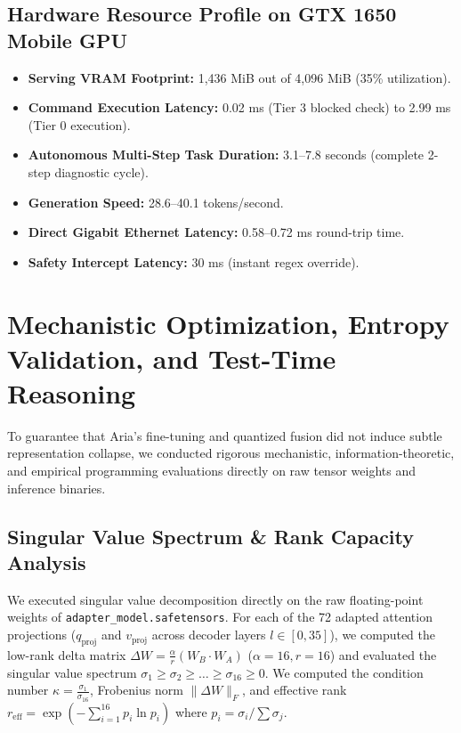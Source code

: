 \documentclass[10pt,a4paper]{article}
\begin{document}
\subsection{Hardware Resource Profile on GTX 1650 Mobile GPU}
\begin{itemize}
    \item \textbf{Serving VRAM Footprint:} 1,436 MiB out of 4,096 MiB (35\% utilization).
    \item \textbf{Command Execution Latency:} 0.02 ms (Tier 3 blocked check) to 2.99 ms (Tier 0 execution).
    \item \textbf{Autonomous Multi-Step Task Duration:} 3.1--7.8 seconds (complete 2-step diagnostic cycle).
    \item \textbf{Generation Speed:} 28.6--40.1 tokens/second.
    \item \textbf{Direct Gigabit Ethernet Latency:} 0.58--0.72 ms round-trip time.
    \item \textbf{Safety Intercept Latency:} 30 ms (instant regex override).
\end{itemize}

\section{Mechanistic Optimization, Entropy Validation, and Test-Time Reasoning}

To guarantee that Aria's fine-tuning and quantized fusion did not induce subtle representation collapse, we conducted rigorous mechanistic, information-theoretic, and empirical programming evaluations directly on raw tensor weights and inference binaries.

\subsection{Singular Value Spectrum \& Rank Capacity Analysis}
We executed singular value decomposition directly on the raw floating-point weights of \texttt{adapter\_model.safetensors}. For each of the 72 adapted attention projections ($q_{\text{proj}}$ and $v_{\text{proj}}$ across decoder layers $l \in [0, 35]$), we computed the low-rank delta matrix $\Delta W = \frac{\alpha}{r} (W_B \cdot W_A)$ ($\alpha=16, r=16$) and evaluated the singular value spectrum $\sigma_1 \ge \sigma_2 \ge \dots \ge \sigma_{16} \ge 0$. We computed the condition number $\kappa = \frac{\sigma_1}{\sigma_{16}}$, Frobenius norm $\|\Delta W\|_F$, and effective rank $r_{\text{eff}} = \exp\left(-\sum_{i=1}^{16} p_i \ln p_i\right)$ where $p_i = \sigma_i / \sum \sigma_j$.
\end{document}
